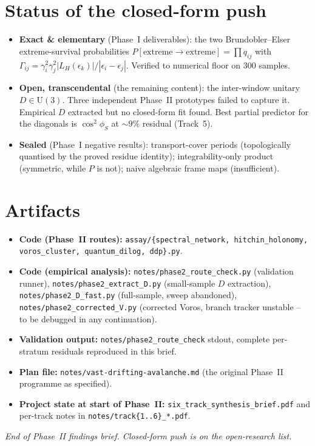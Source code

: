 \documentclass[11pt]{article}
\begin{document}
\section{Status of the closed-form push}

\begin{itemize}
 \item \textbf{Exact \& elementary} (Phase~I deliverables): the two
 Brundobler--Elser extreme-survival probabilities
 $P[\text{extreme}\to\text{extreme}] = \prod q_{ij}$
 with $\Gamma_{ij} = \gamma_i^2\gamma_j^2|L_H(\epsilon_k)|/|\epsilon_i-\epsilon_j|$.
 Verified to numerical floor on $300$ samples.

 \item \textbf{Open, transcendental} (the remaining content): the
 inter-window unitary $D\in\mathrm U(3)$. Three independent Phase~II
 prototypes failed to capture it. Empirical $D$ extracted but no
 closed-form fit found. Best partial predictor for the diagonals is
 $\cos^2\phi_S$ at $\sim 9\%$ residual (Track~5).

 \item \textbf{Sealed} (Phase~I negative results): transport-cover
 periods (topologically quantised by the proved residue identity);
 integrability-only product (symmetric, while $P$ is not); naive
 algebraic frame maps (insufficient).
\end{itemize}

\section{Artifacts}

\begin{itemize}
 \item \textbf{Code (Phase~II routes):} \texttt{assay/\{spectral\_network,
 hitchin\_holonomy, voros\_cluster, quantum\_dilog, ddp\}.py}.
 \item \textbf{Code (empirical analysis):}
 \texttt{notes/phase2\_route\_check.py} (validation runner),
 \texttt{notes/phase2\_extract\_D.py} (small-sample $D$ extraction),
 \texttt{notes/phase2\_D\_fast.py} (full-sample, sweep abandoned),
 \texttt{notes/phase2\_corrected\_V.py} (corrected Voros, branch tracker
 unstable -- to be debugged in any continuation).
 \item \textbf{Validation output:}
 \texttt{notes/phase2\_route\_check} stdout, complete per-stratum
 residuals reproduced in this brief.
 \item \textbf{Plan file:} \texttt{notes/vast-drifting-avalanche.md}
 (the original Phase~II programme as specified).
 \item \textbf{Project state at start of Phase~II:}
 \texttt{six\_track\_synthesis\_brief.pdf} and per-track notes in
 \texttt{notes/track\{1..6\}\_*.pdf}.
\end{itemize}

\vspace{0.4em}

\noindent\hfill\textcolor{MutedText}{\emph{End of Phase~II findings brief.
Closed-form push is on the open-research list.}}\hfill\null
\end{document}
